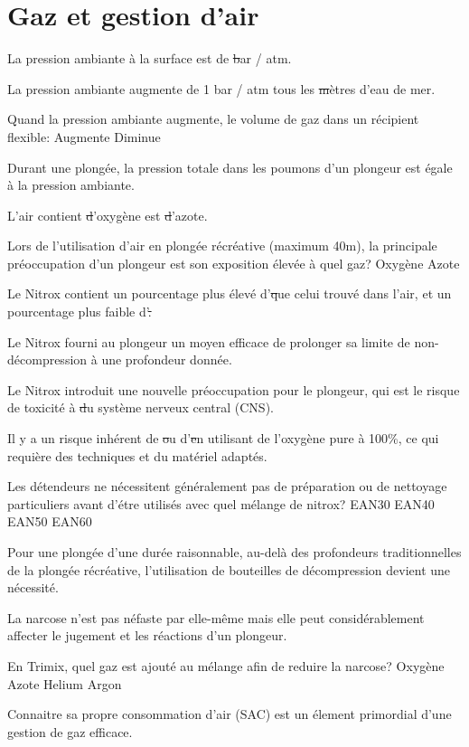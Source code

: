 \documentclass[english,10pt,a4paper]{article}
\begin{document}
	\section{Gaz et gestion d'air}
	\begin{outline}
		\1 La pression ambiante à la surface est de \st bar / atm.
		\vspace{1cm}

		\1 La pression ambiante augmente de 1 bar / atm tous les \st mètres d'eau de mer.
		\vspace{1cm}

		\1 Quand la pression ambiante augmente, le volume de gaz dans un récipient flexible:
			\2 Augmente
			\2 Diminue

		\1 Durant une plongée, la pression totale dans les poumons d'un plongeur est égale à la pression ambiante. \vf

		\1 L'air contient \st d'oxygène est \st d'azote.
		\vspace{1cm}

		\1 Lors de l'utilisation d'air en plongée récréative (maximum 40m), la principale préoccupation d'un plongeur est son exposition élevée à quel gaz?
			\2 Oxygène
			\2 Azote

		\1 Le Nitrox contient un pourcentage plus élevé d'\st que celui trouvé dans l'air, et un pourcentage plus faible d'\st.
		\vspace{1cm}

		\1 Le Nitrox fourni au plongeur un moyen efficace de prolonger sa limite de non-décompression à une profondeur donnée. \vf

		\1 Le Nitrox introduit une nouvelle préoccupation pour le plongeur, qui est le risque de toxicité à \st du système nerveux central (CNS).
		\vspace{1cm}

		\1 Il y a un risque inhérent de \st ou d'\st en utilisant de l'oxygène pure à 100\%, ce qui requière des techniques et du matériel adaptés.
		\vspace{1cm}

		\1 Les détendeurs ne nécessitent généralement pas de préparation ou de nettoyage particuliers avant d'étre utilisés avec quel mélange de nitrox?
			\2 EAN30
			\2 EAN40
			\2 EAN50
			\2 EAN60

		\1	Pour une plongée d'une durée raisonnable, au-delà des profondeurs traditionnelles de la plongée récréative, l'utilisation de bouteilles de décompression devient une nécessité. \vf

		\1 La narcose n'est pas néfaste par elle-même mais elle peut considérablement affecter le jugement et les réactions d'un plongeur. \vf

		\1 En Trimix, quel gaz est ajouté au mélange afin de reduire la narcose?
			\2 Oxygène
			\2 Azote
			\2 Helium
			\2 Argon

		\1 Connaitre sa propre consommation d'air (SAC) est un élement primordial d'une gestion de gaz efficace. \vf 
	\end{outline}
	\pagebreak
	
\end{document}
